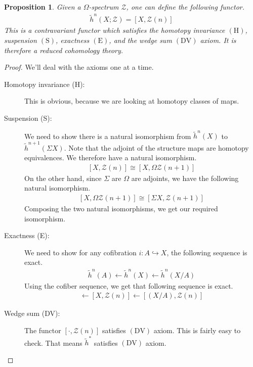\documentclass[12pt, notitlepage]{article}
\newtheorem{prop}[thm]{Proposition}
\theoremstyle{definition}
\newcommand{\calz}{\mathcal{Z}}
\newcommand{\redco}{\widetilde{h}}
\newcommand{\dv}{\mathrm{DV}}
\begin{document}
\begin{prop}
  Given a $\Omega$-spectrum $\calz$, one can define the following functor.
  \begin{align*}
    \redco^n(X; \calz) = \left[X, \calz(n)\right]
  \end{align*}
  This is a contravariant functor which satisfies the homotopy invariance $(\mathrm{H})$, suspension
  $(\mathrm{S})$, exactness $(\mathrm{E})$, and the wedge sum $(\dv)$ axiom. It is therefore a
  reduced cohomology theory.
\end{prop}

\begin{proof}
  We'll deal with the axioms one at a time.
  \begin{description}
  \item[Homotopy invariance (H):] This is obvious, because we are looking at homotopy classes of
    maps.
  \item[Suspension (S):] We need to show there is a natural isomorphism from $\redco^n(X)$ to
    $\redco^{n+1}(\Sigma X)$. Note that the adjoint of the structure maps are homotopy equivalences.
    We therefore have a natural isomorphism.
    \begin{align*}
      \left[ X, \calz(n) \right] \cong \left[ X, \Omega \calz(n+1) \right]
    \end{align*}
    On the other hand, since $\Sigma$ are $\Omega$ are adjoints, we have the following natural
    isomorphism.
    \begin{align*}
      \left[ X, \Omega \calz(n+1) \right] \cong \left[ \Sigma X, \calz(n+1) \right]
    \end{align*}
    Composing the two natural isomorphisms, we get our required isomorphism.
  \item[Exactness (E):] We need to show for any cofibration $i: A \hookrightarrow X$, the following
    sequence is exact.
    \begin{align*}
      \redco^n(A) \leftarrow \redco^n(X) \leftarrow \redco^n\left( X/A \right)
    \end{align*}
    Using the cofiber sequence, we get that following sequence is exact.
    \begin{align*}
      [A, \calz(n)] \leftarrow [X, \calz(n)] \leftarrow \left[\left(X/A\right), \calz(n) \right]
    \end{align*}
  \item[Wedge sum (DV):] The functor $[\cdot, \calz(n)]$ satisfies $(\dv)$ axiom. This is fairly
    easy to check. That means $\redco^{\ast}$ satisfies $(\dv)$ axiom.
  \end{description}
\end{proof}
\end{document}
